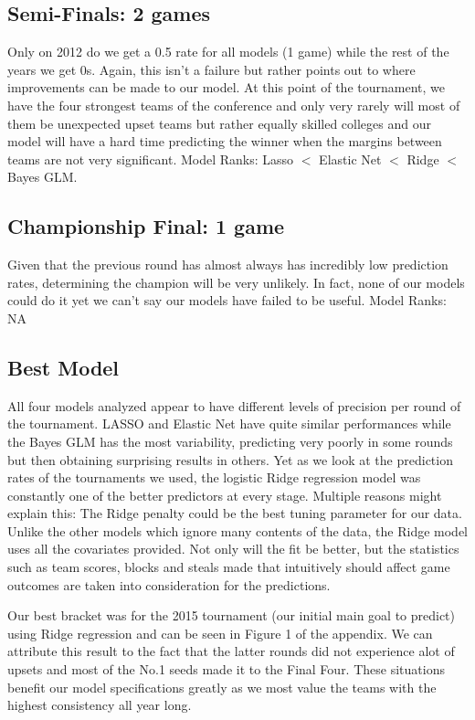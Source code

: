 \documentclass{article} %
\begin{document}
\subsection{Semi-Finals: 2 games}

Only on 2012 do we get a 0.5 rate for all models (1 game) while the rest of the years we get 0s. Again, this isn't a failure but rather points out to where improvements can be made to our model. At this point of the tournament, we have the four strongest teams of the conference and only very rarely will most of them be unexpected upset teams but rather equally skilled colleges and our model will have a hard time predicting the winner when the margins between teams are not very significant. Model Ranks: Lasso  $<$ Elastic Net $<$ Ridge $<$ Bayes GLM.  

\subsection{Championship Final: 1 game}

Given that the previous round has almost always has incredibly low prediction rates, determining the champion will be very unlikely. In fact, none of our models could do it yet we can't say our models have failed to be useful. Model Ranks: NA

\subsection{Best Model}

All four models analyzed appear to have different levels of precision per round of the tournament. LASSO and Elastic Net have quite similar performances while the Bayes GLM has the most variability, predicting very poorly in some rounds but then obtaining surprising results in others. Yet as we look at the prediction rates of the tournaments we used, the logistic Ridge regression model was constantly one of the better predictors at every stage. Multiple reasons might explain this: The Ridge penalty could be the best tuning parameter for our data. Unlike the other models which ignore many contents of the data, the Ridge model uses all the covariates provided. Not only will the fit be better, but the statistics such as team scores, blocks and steals made that intuitively should affect game outcomes are taken into consideration for the predictions.

Our best bracket was for the 2015 tournament (our initial main goal to predict) using Ridge regression and can be seen in Figure 1 of the appendix. We can attribute this result to the fact that the latter rounds did not experience alot of upsets and most of the No.1 seeds made it to the Final Four. These situations benefit our model specifications greatly as we most value the teams with the highest consistency all year long.
\end{document}
